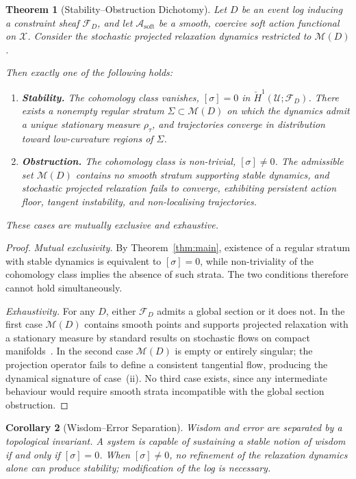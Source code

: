\documentclass[12pt,oneside]{article}
\theoremstyle{plain}
\newtheorem{theorem}{Theorem}[section]
\newtheorem{corollary}[theorem]{Corollary}
\theoremstyle{definition}
\theoremstyle{remark}
\newcommand{\X}{\mathcal{X}}
\newcommand{\M}{\mathcal{M}}
\newcommand{\Sh}{\mathcal{F}}
\newcommand{\D}{D}
\newcommand{\Hcheck}{\check{H}}
\newcommand{\Sig}{\Sigma}
\newcommand{\rhotau}{\rho_\tau}
\newcommand{\Asoft}{\mathcal{A}_{\mathrm{soft}}}
\begin{document}
\begin{theorem}[Stability--Obstruction Dichotomy]
\label{thm:dichotomy}
Let $\D$ be an event log inducing a constraint sheaf $\Sh_\D$, and let $\Asoft$
be a smooth, coercive soft action functional on $\X$. Consider the stochastic
projected relaxation dynamics restricted to $\M(\D)$.

Then exactly one of the following holds:
\begin{enumerate}[label=(\roman*)]
  \item \textbf{Stability.} The cohomology class vanishes, $[\sigma] = 0$ in
        $\Hcheck^1(\mathcal{U};\Sh_\D)$. There exists a nonempty regular stratum
        $\Sig \subset \M(\D)$ on which the dynamics admit a unique stationary
        measure $\rhotau$, and trajectories converge in distribution toward
        low-curvature regions of $\Sig$.
  \item \textbf{Obstruction.} The cohomology class is non-trivial,
        $[\sigma] \neq 0$. The admissible set $\M(\D)$ contains no smooth
        stratum supporting stable dynamics, and stochastic projected relaxation
        fails to converge, exhibiting persistent action floor, tangent
        instability, and non-localising trajectories.
\end{enumerate}
These cases are mutually exclusive and exhaustive.
\end{theorem}

\begin{proof}
\emph{Mutual exclusivity.} By Theorem~\ref{thm:main}, existence of a regular
stratum with stable dynamics is equivalent to $[\sigma] = 0$, while
non-triviality of the cohomology class implies the absence of such strata.
The two conditions therefore cannot hold simultaneously.

\emph{Exhaustivity.} For any $\D$, either $\Sh_\D$ admits a global section or
it does not. In the first case $\M(\D)$ contains smooth points and supports
projected relaxation with a stationary measure by standard results on stochastic
flows on compact manifolds~\cite{Hairer2009}. In the second case $\M(\D)$ is empty or entirely
singular; the projection operator fails to define a consistent tangential flow,
producing the dynamical signature of case~(ii). No third case exists, since any
intermediate behaviour would require smooth strata incompatible with the
global section obstruction.
\end{proof}

\begin{corollary}[Wisdom--Error Separation]
\label{cor:wisdom_error}
Wisdom and error are separated by a topological invariant. A system is capable
of sustaining a stable notion of wisdom if and only if $[\sigma] = 0$. When
$[\sigma] \neq 0$, no refinement of the relaxation dynamics alone can produce
stability; modification of the log is necessary.
\end{corollary}
\end{document}
